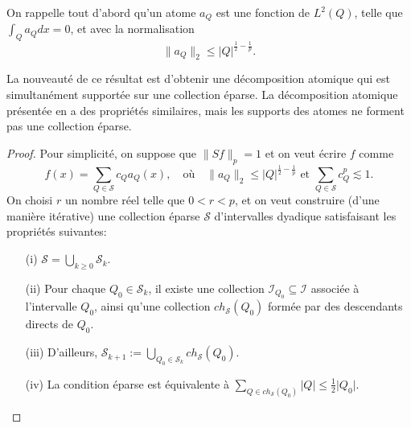 \documentclass[11pt]{amsart}
\newcommand{\ii}{\mathscr}
\newcommand{\ic}{\mathcal}
\newcommand{\ds}{\displaystyle}
\begin{document}
On rappelle tout d'abord qu'un atome $a_Q$ est une fonction de $L^2(Q)$, telle que $\int_Q a_Q dx=0$, et avec la normalisation
$$ \| a_Q\|_2 \leq \vert Q \vert^{\frac{1}{2}-\frac{1}{p}}.$$

La nouveaut\'e de ce r\'esultat est d'obtenir une d\'ecomposition atomique qui est simultanément support\'ee sur une collection \'eparse. La d\'ecomposition atomique pr\'esent\'ee en \cite{TreesBMOCarlesonMeasures} a des propri\'et\'es similaires, mais les supports des atomes ne forment pas une collection \'eparse.



\begin{proof}
Pour simplicit\'e, on suppose que $\| Sf  \|_p=1 $ et on veut \'ecrire $f$ comme
\[
f(x)=\sum_{Q \in \ic{S}} c_Q a_Q(x), \quad \text{o\`u} \quad \| a_Q\|_2 \leq \vert Q \vert^{\frac{1}{2}-\frac{1}{p}} \text{   et   } \sum_{Q \in \mathcal{S}} c_Q^p \lesssim 1.
\]
On choisi $r$ un nombre r\'eel telle que $0<r<p$, et on veut construire (d'une mani\`ere it\'erative) une collection \'eparse $\ic S$ d'intervalles dyadique satisfaisant les propri\'et\'es suivantes:
\begin{enumerate}
\item[(i)] $\ic S =\bigcup_{k \geq 0} \ic S_k$.
\item[(ii)] Pour chaque $Q_0 \in \ic S_k$, il existe une collection $\ii I_{Q_0} \subseteq \ii I$ associ\'ee \`a l'intervalle $Q_0$, ainsi qu'une collection $ch_{\ic S}(Q_0)$ form\'ee par des descendants directs de $Q_0$.
\item[(iii)] D'ailleurs, $\ic S_{k+1}:=\bigcup_{Q_0 \in \ic S_k} ch_{\ic S}(Q_0)$.
\item[(iv)] La condition \'eparse est \'equivalente \`a $\ds \sum_{Q \in ch_{\ic S}(Q_0)} \vert Q \vert \leq \frac{1}{2} \vert Q_0 \vert$.
\end{enumerate}


\end{proof}
\end{document}
